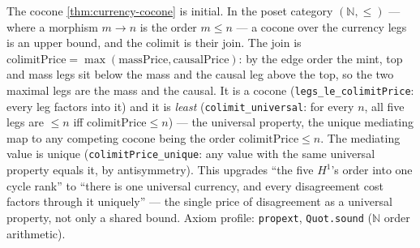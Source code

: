 \begin{theorem}\label{thm:currency-colimit}\leanok{}
The cocone \cref{thm:currency-cocone} is initial. In the poset category
\((\mathbb N, \le)\) --- where a morphism \(m \to n\) is the order \(m \le n\) ---
a cocone over the currency legs is an upper bound, and the colimit is their join.
The join is \(\mathrm{colimitPrice} = \max(\mathrm{massPrice},
\mathrm{causalPrice})\): by the edge order the mint, top and mass legs sit below
the mass and the causal leg above the top, so the two maximal legs are the mass
and the causal. It is a cocone (\texttt{legs\_le\_colimitPrice}: every leg factors
into it) and it is \emph{least} (\texttt{colimit\_universal}: for every \(n\), all
five legs are \(\le n\) iff \(\mathrm{colimitPrice} \le n\)) --- the universal
property, the unique mediating map to any competing cocone being the order
\(\mathrm{colimitPrice} \le n\). The mediating value is unique
(\texttt{colimitPrice\_unique}: any value with the same universal property equals
it, by antisymmetry). This upgrades ``the five \(H^1\)'s order into one cycle
rank'' to ``there is one universal currency, and every disagreement cost factors
through it uniquely'' --- the single price of disagreement as a universal
property, not only a shared bound. Axiom profile: \texttt{propext},
\texttt{Quot.sound} (\(\mathbb N\) order arithmetic).
\end{theorem}
